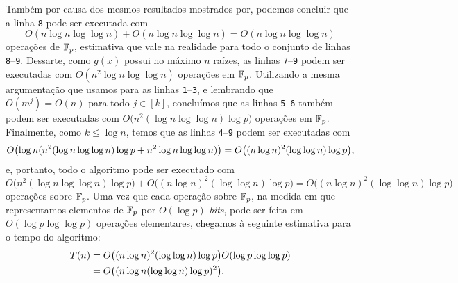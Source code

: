 Também por causa dos mesmos resultados mostrados
por\xspace\cite{design}, podemos concluir que a linha \texttt{8} pode
ser executada com
\begin{equation*}
  O(n\log{n}\log{\log{n}}) +
  O(n\log{n}\log{\log{n}}) =
  O(n\log{n}\log{\log{n}})
\end{equation*}
operações de $\mathbb{F}_{p}$, estimativa que vale na realidade para todo o
conjunto de linhas \texttt{8}--\texttt{9}. Dessarte, como $g(x)$ possui
no máximo $n$ raízes, as linhas \texttt{7}--\texttt{9} podem ser
executadas
com $O(n^2\log{n}\log{\log{n}})$
operações em $\mathbb{F}_{p}$. Utilizando a mesma
argumentação que usamos para as linhas \texttt{1}--\texttt{3}, e
lembrando que $O(m^j)=O(n)$ para todo $j\in[k]$,
concluímos que as linhas \texttt{5}--\texttt{6} também podem ser
executadas com $O\bigl(n^2(\log{n}\log{\log{n}})\log{p}\bigr)$ operações
em $\mathbb{F}_{p}$. Finalmente, como $k\leq \log{n}$, temos que as linhas
\texttt{4}--\texttt{9} podem ser executadas com
\begin{equation*}
  O\bigl(\log{n}(
    n^2(\log{n}\log{\log{n}})\log{p} +
    n^2\log{n}\log{\log{n}}
    )\bigr) =
    O\bigl((n\log{n})^2(\log{\log{n}})\log{p}\bigr)\mathrm{,}
\end{equation*}
e, portanto, todo o algoritmo pode ser executado com
\begin{equation*}
  O\bigl(n^2(\log{n}\log{\log{n}})\log{p}\bigr) +
  O\bigl((n\log{n})^2(\log{\log{n}})\log{p}\bigr) =
  O\bigl((n\log{n})^2(\log{\log{n}})\log{p}\bigr)
\end{equation*}
operações sobre $\mathbb{F}_{p}$. Uma vez que cada operação sobre
$\mathbb{F}_{p}$, na medida em que representamos elementos de $\mathbb{F}_{p}$
por $O(\log{p})$ \textit{bits}, pode ser feita em
$O(\log{p}\log{\log{p}})$ operações elementares, chegamos à seguinte
estimativa para o tempo do algoritmo:
\begin{equation*}
  \begin{aligned}
  \simb[tempo de execução de um algoritmo com tamanho da entrada
  $n$]{T(n)}
  &=   O\bigl((n\log{n})^2(\log{\log{n}})\log{p}\bigr)
            O(\log{p}\log{\log{p}})\\
       &= O\bigl((n\log{n}(\log{\log{n}})\log{p})^2\bigr)\MMp
  \end{aligned}
\end{equation*}

